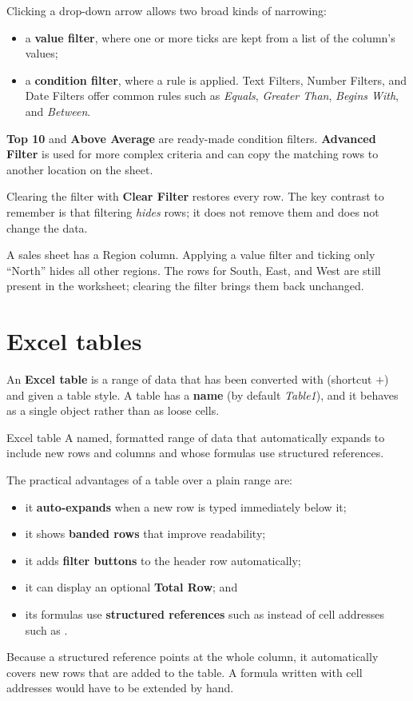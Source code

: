 Clicking a drop-down arrow allows two broad kinds of narrowing:
\begin{itemize}
  \item a \textbf{value filter}, where one or more ticks are kept from a list of
    the column's values;
  \item a \textbf{condition filter}, where a rule is applied. Text Filters,
    Number Filters, and Date Filters offer common rules such as \textit{Equals},
    \textit{Greater Than}, \textit{Begins With}, and \textit{Between}.
\end{itemize}
\textbf{Top 10} and \textbf{Above Average} are ready-made condition filters.
\textbf{Advanced Filter} is used for more complex criteria and can copy the
matching rows to another location on the sheet.

Clearing the filter with \textbf{Clear Filter} restores every row. The key
contrast to remember is that filtering \emph{hides} rows; it does not remove
them and does not change the data.

\begin{example}
A sales sheet has a Region column. Applying a value filter and ticking only
``North'' hides all other regions. The rows for South, East, and West are still
present in the worksheet; clearing the filter brings them back unchanged.
\end{example}

\section{Excel tables}
An \textbf{Excel table} is a range of data that has been converted with
 (shortcut $+$) and given a table style. A
table has a \textbf{name} (by default \textit{Table1}), and it behaves as a
single object rather than as loose cells.

\begin{definitionbox}{Excel table}
A named, formatted range of data that automatically expands to include new
rows and columns and whose formulas use structured references.
\end{definitionbox}

The practical advantages of a table over a plain range are:
\begin{itemize}
  \item it \textbf{auto-expands} when a new row is typed immediately below it;
  \item it shows \textbf{banded rows} that improve readability;
  \item it adds \textbf{filter buttons} to the header row automatically;
  \item it can display an optional \textbf{Total Row}; and
  \item its formulas use \textbf{structured references} such as
     instead of cell addresses such as .
\end{itemize}
Because a structured reference points at the whole column, it automatically
covers new rows that are added to the table. A formula written with cell
addresses would have to be extended by hand.

